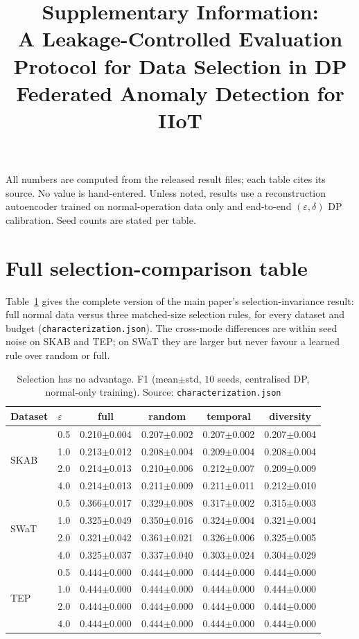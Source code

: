 \documentclass{article}
\title{Supplementary Information:\\ A Leakage-Controlled Evaluation Protocol for Data Selection in DP Federated Anomaly Detection for IIoT}
\author{}\date{}
\providecommand{\botrule}{\bottomrule}%
\begin{document}
\maketitle

All numbers are computed from the released result files; each table cites its source.
No value is hand-entered. Unless noted, results use a reconstruction autoencoder trained
on normal-operation data only and end-to-end $(\varepsilon,\delta)$ DP calibration.
Seed counts are stated per table.

\section{Full selection-comparison table}\label{supp:char}
Table~\ref{tab:scharfull} gives the complete version of the main paper's
selection-invariance result: full normal data versus three matched-size selection rules,
for every dataset and budget (\texttt{characterization.json}). The cross-mode differences
are within seed noise on SKAB and TEP; on SWaT they are larger but never favour a learned
rule over random or full.

\begin{table}[h]\centering
\caption{Selection has no advantage. F1 (mean$\pm$std, $10$ seeds, centralised DP,
normal-only training). Source: \texttt{characterization.json}}\label{tab:scharfull}
\begin{tabular}{@{}llcccc@{}}
\toprule
Dataset & $\varepsilon$ & full & random & temporal & diversity \\
\midrule
\multirow{4}{*}{SKAB}
 & 0.5 & 0.210$\pm$0.004 & 0.207$\pm$0.002 & 0.207$\pm$0.002 & 0.207$\pm$0.004 \\
 & 1.0 & 0.213$\pm$0.012 & 0.208$\pm$0.004 & 0.209$\pm$0.004 & 0.208$\pm$0.004 \\
 & 2.0 & 0.214$\pm$0.013 & 0.210$\pm$0.006 & 0.212$\pm$0.007 & 0.209$\pm$0.009 \\
 & 4.0 & 0.214$\pm$0.013 & 0.211$\pm$0.009 & 0.211$\pm$0.011 & 0.212$\pm$0.010 \\
\midrule
\multirow{4}{*}{SWaT}
 & 0.5 & 0.366$\pm$0.017 & 0.329$\pm$0.008 & 0.317$\pm$0.002 & 0.315$\pm$0.003 \\
 & 1.0 & 0.325$\pm$0.049 & 0.350$\pm$0.016 & 0.324$\pm$0.004 & 0.321$\pm$0.004 \\
 & 2.0 & 0.321$\pm$0.042 & 0.361$\pm$0.021 & 0.326$\pm$0.006 & 0.325$\pm$0.005 \\
 & 4.0 & 0.325$\pm$0.037 & 0.337$\pm$0.040 & 0.303$\pm$0.024 & 0.304$\pm$0.029 \\
\midrule
\multirow{4}{*}{TEP}
 & 0.5 & 0.444$\pm$0.000 & 0.444$\pm$0.000 & 0.444$\pm$0.000 & 0.444$\pm$0.000 \\
 & 1.0 & 0.444$\pm$0.000 & 0.444$\pm$0.000 & 0.444$\pm$0.000 & 0.444$\pm$0.000 \\
 & 2.0 & 0.444$\pm$0.000 & 0.444$\pm$0.000 & 0.444$\pm$0.000 & 0.444$\pm$0.000 \\
 & 4.0 & 0.444$\pm$0.000 & 0.444$\pm$0.000 & 0.444$\pm$0.000 & 0.444$\pm$0.000 \\
\botrule
\end{tabular}
\end{table}
\end{document}

